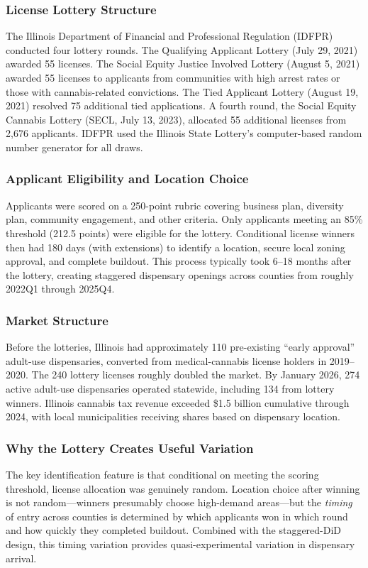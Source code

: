 \documentclass[12pt]{article}
\begin{document}
\subsubsection*{License Lottery Structure} The Illinois Department of Financial and Professional Regulation (IDFPR) conducted four lottery rounds. The Qualifying Applicant Lottery (July 29, 2021) awarded 55 licenses. The Social Equity Justice Involved Lottery (August 5, 2021) awarded 55 licenses to applicants from communities with high arrest rates or those with cannabis-related convictions. The Tied Applicant Lottery (August 19, 2021) resolved 75 additional tied applications. A fourth round, the Social Equity Cannabis Lottery (SECL, July 13, 2023), allocated 55 additional licenses from 2,676 applicants. IDFPR used the Illinois State Lottery's computer-based random number generator for all draws.

\subsubsection*{Applicant Eligibility and Location Choice} Applicants were scored on a 250-point rubric covering business plan, diversity plan, community engagement, and other criteria. Only applicants meeting an 85\% threshold (212.5 points) were eligible for the lottery. Conditional license winners then had 180 days (with extensions) to identify a location, secure local zoning approval, and complete buildout. This process typically took 6--18 months after the lottery, creating staggered dispensary openings across counties from roughly 2022Q1 through 2025Q4.

\subsubsection*{Market Structure} Before the lotteries, Illinois had approximately 110 pre-existing ``early approval'' adult-use dispensaries, converted from medical-cannabis license holders in 2019--2020. The 240 lottery licenses roughly doubled the market. By January 2026, 274 active adult-use dispensaries operated statewide, including 134 from lottery winners. Illinois cannabis tax revenue exceeded \$1.5 billion cumulative through 2024, with local municipalities receiving shares based on dispensary location.

\subsubsection*{Why the Lottery Creates Useful Variation} The key identification feature is that conditional on meeting the scoring threshold, license allocation was genuinely random. Location choice after winning is not random---winners presumably choose high-demand areas---but the \textit{timing} of entry across counties is determined by which applicants won in which round and how quickly they completed buildout. Combined with the staggered-DiD design, this timing variation provides quasi-experimental variation in dispensary arrival.
\end{document}
